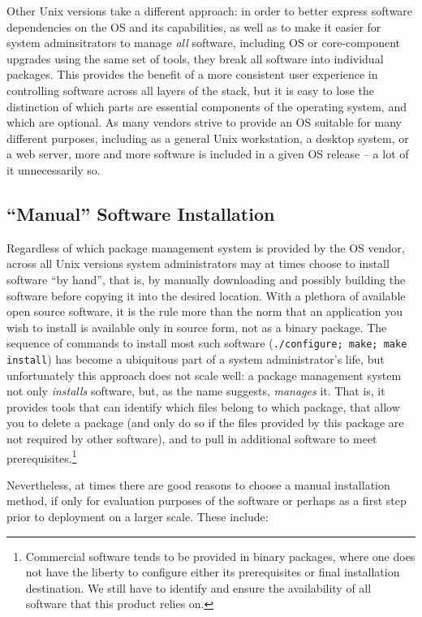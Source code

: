 Other Unix versions take a different approach: in
order to better express software dependencies on the
OS and its capabilities, as well as to make it easier
for system adminsitrators to manage {\em all}
software, including OS or core-component upgrades
using the same set of tools, they break all software
into individual packages.  This provides the benefit
of a more consistent user experience in controlling
software across all layers of the stack, but it is
easy to lose the distinction of which parts are
essential components of the operating system, and
which are optional.  As many vendors strive to provide
an OS suitable for many different purposes,
including as a general Unix workstation, a desktop
system, or a web server, more and more software is
included in a given OS release -- a lot of it
unnecessarily so.

\subsection{``Manual'' Software Installation}
\label{software-installation:package-management:manual}

Regardless of which package management system is
provided by the OS vendor, across all Unix versions
system administrators may at times choose to install
software ``by hand'', that is, by manually downloading
and possibly building the software before copying it
into the desired location.  With a plethora of
available open source software, it is the rule more
than the norm that an application you wish to install
is available only in source form, not as a binary
package.  The sequence of commands to install most
such software ({\tt ./configure; make; make install})
has become a ubiquitous part of a system
administrator's life, but unfortunately this approach
does not scale well:  a package management system not
only {\em installs} software, but, as the name
suggests, {\em manages} it.  That is, it provides tools
that can identify which files belong to which package,
that allow you to delete a package (and only do so if
the files provided by this package are not required by
other software), and to pull in additional software to
meet prerequisites.\footnote{Commercial software tends
to be provided in binary packages, where one does not
have the liberty to configure either its prerequisites
or final installation destination.  We still have to
identify and ensure the availability of all software
that this product relies on.}

Nevertheless, at times there are good reasons to choose a manual
installation method, if only for evaluation purposes of the software or
perhaps as a first step prior to deployment on a larger scale.  These
include:

